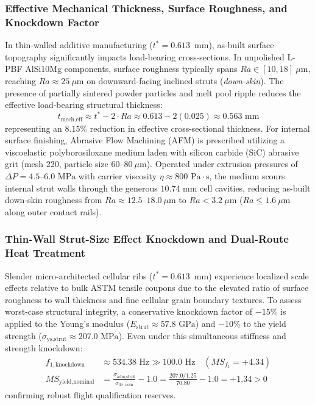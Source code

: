 \documentclass[preprint,12pt,3p]{elsarticle}
\begin{document}
\subsubsection{Effective Mechanical Thickness, Surface Roughness, and Knockdown Factor}
In thin-walled additive manufacturing ($t^* = 0.613$~mm), as-built surface topography significantly impacts load-bearing cross-sections. In unpolished L-PBF AlSi10Mg components, surface roughness typically spans $Ra \in [10, 18]\ \mu\text{m}$, reaching $Ra \approx 25\ \mu\text{m}$ on downward-facing inclined struts (\textit{down-skin}). The presence of partially sintered powder particles and melt pool ripple reduces the effective load-bearing structural thickness:
\begin{equation}
  t_{\text{mech,eff}} \approx t^* - 2 \cdot Ra \approx 0.613 - 2(0.025) \approx 0.563\text{ mm}
  \label{eq:skin-effect}
\end{equation}
representing an $8.15\%$ reduction in effective cross-sectional thickness. For internal surface finishing, Abrasive Flow Machining (AFM) is prescribed utilizing a viscoelastic polyborosiloxane medium laden with silicon carbide (SiC) abrasive grit (mesh 220, particle size $60\text{--}80\ \mu\text{m}$). Operated under extrusion pressures of $\Delta P = 4.5\text{--}6.0\text{ MPa}$ with carrier viscosity $\eta \approx 800\text{ Pa}\cdot\text{s}$, the medium scours internal strut walls through the generous $10.74\text{ mm}$ cell cavities, reducing as-built down-skin roughness from $Ra \approx 12.5\text{--}18.0\ \mu\text{m}$ to $Ra < 3.2\ \mu\text{m}$ ($Ra \le 1.6\ \mu\text{m}$ along outer contact rails).

\subsubsection{Thin-Wall Strut-Size Effect Knockdown and Dual-Route Heat Treatment}
Slender micro-architected cellular ribs ($t^* = 0.613$~mm) experience localized scale effects relative to bulk ASTM tensile coupons due to the elevated ratio of surface roughness to wall thickness and fine cellular grain boundary textures. To assess worst-case structural integrity, a conservative knockdown factor of $-15\%$ is applied to the Young's modulus ($E_{\text{strut}} \approx 57.8\text{ GPa}$) and $-10\%$ to the yield strength ($\sigma_{\text{ys,strut}} \approx 207.0\text{ MPa}$). Even under this simultaneous stiffness and strength knockdown:
\begin{align}
  f_{1,\text{knockdown}} &\approx 534.38\text{ Hz} \gg 100.0\text{ Hz} \quad (MS_{f_1} = +4.34) \\
  MS_{\text{yield,nominal}} &= \frac{\sigma_{\text{adm,strut}}}{\sigma_{3\sigma,\text{nom}}} - 1.0 = \frac{207.0 / 1.25}{70.80} - 1.0 = +1.34 > 0
\end{align}
confirming robust flight qualification reserves.
\end{document}
